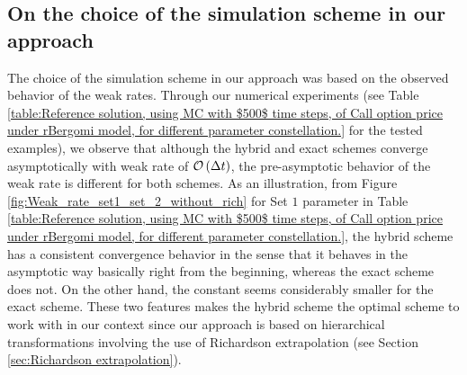 \subsection{On the choice of the simulation scheme in our approach}\label{sec: choice of simulation scheme}
The choice of the simulation scheme in our approach was based on the observed behavior of the weak rates. Through our numerical experiments (see Table \ref{table:Reference solution, using MC with $500$ time steps, of Call option price under rBergomi model, for different parameter constellation.} for the tested examples), we observe that although the hybrid and exact schemes  converge asymptotically with weak rate of ${\mathcal{O}}\left(\Delta t\right)$, the pre-asymptotic behavior of the weak rate is different for both schemes. As an illustration, from Figure \ref{fig:Weak_rate_set1_set_2_without_rich} for Set $1$ parameter in Table \ref{table:Reference solution, using MC with $500$ time steps, of Call option price under rBergomi model, for different parameter constellation.}, the hybrid scheme  has a consistent convergence behavior in the sense that it behaves in the asymptotic way basically right from the beginning, whereas the exact scheme does not. On the other
hand, the constant  seems considerably smaller for the exact scheme. These two features  makes the hybrid scheme the optimal scheme  to work with in our context since our approach is based on hierarchical transformations involving the use of Richardson extrapolation (see Section \ref{sec:Richardson extrapolation}).